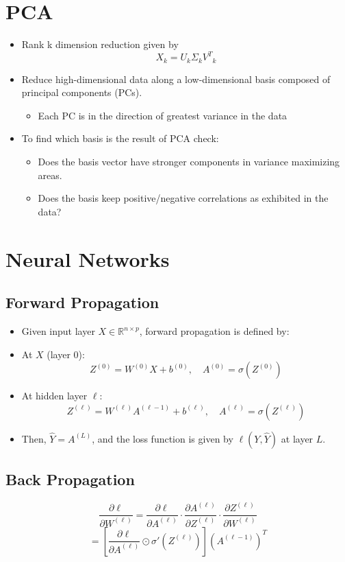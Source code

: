 \documentclass{article}
\begin{document}
\section{PCA}
\begin{itemize}
    \item Rank k dimension reduction given by
    \[
        X_k = U_k\Sigma_k{V^T}_k
    \]
    \item Reduce high-dimensional data along a low-dimensional basis composed of principal components (PCs).
        \begin{itemize}
            \item Each PC is in the direction of greatest variance in the data
        \end{itemize}
    \item To find which basis is the result of PCA check:
        \begin{itemize}
            \item Does the basis vector have stronger components in variance maximizing areas.
            \item Does the basis keep positive/negative correlations as exhibited in the data?
        \end{itemize}
\end{itemize}

\section{Neural Networks}

\subsection{Forward Propagation}
\begin{itemize}
    \item Given input layer $X \in \mathbb{R}^{n \times p}$, forward propagation is defined by:
    \item At $X$ (layer 0):
        \[
            Z^{(0)} = W^{(0)}X + b^{(0)}, \quad A^{(0)} = \sigma(Z^{(0)})
        \]
    \item At hidden layer $\ell$:
        \[
            Z^{(\ell)} = W^{(\ell)}A^{(\ell-1)} + b^{(\ell)}, \quad A^{(\ell)} = \sigma(Z^{(\ell)})
        \]
    \item Then, $\hat{Y} = A^{(L)}$, and the loss function is given by $\ell(Y, \hat{Y})$ at layer $L$.
\end{itemize}

\subsection{Back Propagation}
\[
    \frac{\partial \ell}{\partial W^{(\ell)}} = \frac{\partial \ell}{\partial A^{(\ell)}} \cdot \frac{\partial A^{(\ell)}}{\partial Z^{(\ell)}} \cdot \frac{\partial Z^{(\ell)}}{\partial W^{(\ell)}}
\]
\[
    = \left[ \frac{\partial \ell}{\partial A^{(\ell)}} \odot \sigma'(Z^{(\ell)}) \right] (A^{(\ell-1)})^T
\]
\end{document}
